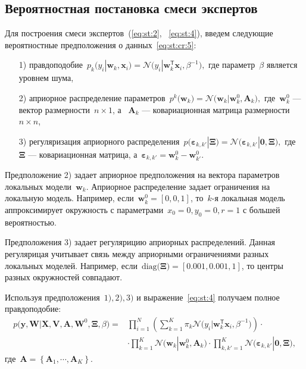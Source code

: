 \subsection{Вероятностная постановка смеси экспертов}
Для построения смеси экспертов~(\ref{eq:st:2}, ~\ref{eq:st:4}), введем следующие вероятностные предположения о данных~\eqref{eq:st:cr:5}:

\begin{enumerate}
	\item[1)] правдоподобие~$p_{k}\bigr(y_{i}|\mathbf{w}_{k}, \mathbf{x}_{i}\bigr) = \mathcal{N}\bigr(y_{i}|\mathbf{w}_{k}^{\mathsf{T}}\mathbf{x}_{i}, \beta^{-1}\bigr),$ где параметр~$\beta$ является уровнем шума,
	\item[2)] априорное распределение параметров~$p^{k}\bigr(\mathbf{w}_{k}\bigr) = \mathcal{N}\bigr(\mathbf{w}_{k}|\mathbf{w}^{0}_{k}, \mathbf{A}_{k}\bigr),$ где~$\mathbf{w}^{0}_{k}$ --- вектор размерности~$n\times1$, а ~$\mathbf{A}_{k}$ --- ковариационная матрица размерности~$n\times n$,
	\item[3)] регуляризация априорного распределения~$p\bigr(\bm{\varepsilon}_{k,k'}|\bm{\Xi}\bigr) = \mathcal{N}\bigr(\bm{\varepsilon}_{k,k'}|\mathbf{0},  \bm{\Xi}\bigr),$ где~$\bm{\Xi}$ --- ковариационная матрица, а~$\bm{\varepsilon}_{k,k'} = \mathbf{w}_{k}^{0}-\mathbf{w}_{k'}^{0}.$
\end{enumerate}
Предположение 2) задает априорное предположения на вектора параметров локальных модели~$\textbf{w}_k$. Априорное распределение  задает ограничения на локальную модель. Например, если~$\textbf{w}_k^{0} = [0,0,1]$, то~$k$-я локальная модель аппроксимирует окружность с параметрами~$x_0=0, y_0=0, r=1$ с большей вероятностью.

Предположения 3) задает регулярицию априорных распределений. Данная регулярицая учитывает связь между априорными ограничениями разных локальных моделей. Например, если~$\text{diag}\bigr(\bm{\Xi}\bigr)=[0.001, 0.001, 1]$, то  центры разных окружностей совпадают.

Используя предположения~$1), 2), 3)$ и выражение~\eqref{eq:st:4} получаем полное правдоподобие:
\[
\label{eq:em:1}
\begin{aligned}
p\bigr(\mathbf{y}, \mathbf{W}|\mathbf{X}, \mathbf{V}, \textbf{A}, \textbf{W}^{0}, \bm{\Xi}, \beta\bigr) = &\prod_{i=1}^{N}\left(\sum_{k=1}^{K}\pi_{k}\mathcal{N}\bigr(y_{i}|\mathbf{w}_{k}^{\mathsf{T}}\mathbf{x}_{i}, \beta^{-1}\bigr)\right)\cdot\\
&\cdot\prod_{k=1}^{K}\mathcal{N}\bigr(\mathbf{w}_{k}|\mathbf{w}^{0}_{k}, \mathbf{A}_{k}\bigr)\cdot\prod_{k,k'=1}^{K}\mathcal{N}\bigr(\bm{\varepsilon}_{k,k'}|\mathbf{0},  \bm{\Xi}\bigr),
\end{aligned}
\]
 где~$\mathbf{A} = \left\{\mathbf{A}_1, \cdots, \mathbf{A}_K\right\}.$
 
